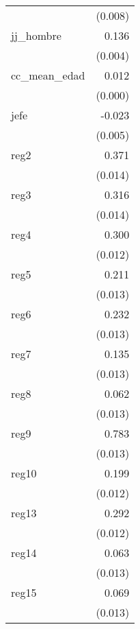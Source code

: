 {\begin{longtable}{l*{1}{D{.}{.}{-1}}}
            &     (0.008)         \\
\addlinespace
jj\_hombre   &       0.136\sym{***}\\
            &     (0.004)         \\
\addlinespace
cc\_mean\_edad&       0.012\sym{***}\\
            &     (0.000)         \\
\addlinespace
jefe        &      -0.023\sym{***}\\
            &     (0.005)         \\
\addlinespace
reg2        &       0.371\sym{***}\\
            &     (0.014)         \\
\addlinespace
reg3        &       0.316\sym{***}\\
            &     (0.014)         \\
\addlinespace
reg4        &       0.300\sym{***}\\
            &     (0.012)         \\
\addlinespace
reg5        &       0.211\sym{***}\\
            &     (0.013)         \\
\addlinespace
reg6        &       0.232\sym{***}\\
            &     (0.013)         \\
\addlinespace
reg7        &       0.135\sym{***}\\
            &     (0.013)         \\
\addlinespace
reg8        &       0.062\sym{***}\\
            &     (0.013)         \\
\addlinespace
reg9        &       0.783\sym{***}\\
            &     (0.013)         \\
\addlinespace
reg10       &       0.199\sym{***}\\
            &     (0.012)         \\
\addlinespace
reg13       &       0.292\sym{***}\\
            &     (0.012)         \\
\addlinespace
reg14       &       0.063\sym{***}\\
            &     (0.013)         \\
\addlinespace
reg15       &       0.069\sym{***}\\
            &     (0.013)         \\

\end{longtable}}
